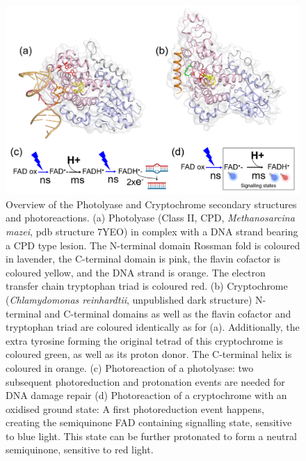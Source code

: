 \begin{figure}[H]
  \centering
  \includegraphics[width=\textwidth]{images/cracry/Photolyase_Cryptochromes.pdf}
  \hfill
  \caption{Overview of the Photolyase and Cryptochrome secondary structures and photoreactions. (a) Photolyase (Class II, CPD, \textit{Methanosarcina mazei}, pdb structure 7YEO) in complex with a DNA strand bearing a CPD type lesion. The N-terminal domain Rossman fold is coloured in lavender, the C-terminal domain is pink, the flavin cofactor is coloured yellow, and the DNA strand is orange. The electron transfer chain tryptophan triad is coloured red. (b) Cryptochrome (\textit{Chlamydomonas reinhardtii}, unpublished dark structure) N-terminal and C-terminal domains as well as the flavin cofactor and tryptophan triad are coloured identically as for (a). Additionally, the extra tyrosine forming the original tetrad of this cryptochrome is coloured green, as well as its proton donor. The C-terminal  helix is coloured in orange. (c) Photoreaction of a photolyase: two subsequent photoreduction and protonation events are needed for DNA damage repair (d) Photoreaction of a cryptochrome with an oxidised ground state: A first photoreduction event happens, creating the semiquinone FAD containing signalling state, sensitive to blue light. This state can be further protonated to form a neutral semiquinone, sensitive to red light.}\label{fig:PCSF}
\end{figure}

